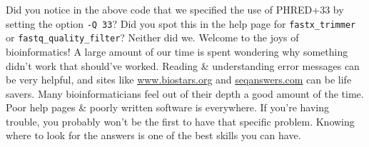 \begin{advanced}
Did you notice in the above code that we specified the use of PHRED+33 by setting the option \texttt{-Q 33}?
Did you spot this in the help page for \texttt{fastx_trimmer} or \texttt{fastq_quality_filter}?
Neither did we.
Welcome to the joys of bioinformatics!
A large amount of our time is spent wondering why something didn't work that should've worked.
Reading \& understanding error messages can be very helpful, and sites like \url{www.biostars.org} and \url{seqanswers.com} can be life savers.
Many bioinformaticians feel out of their depth a good amount of the time.
Poor help pages \& poorly written software is everywhere.
If you're having trouble, you probably won't be the first to have that specific problem.
Knowing where to look for the answers is one of the best skills you can have.
\end{advanced}


